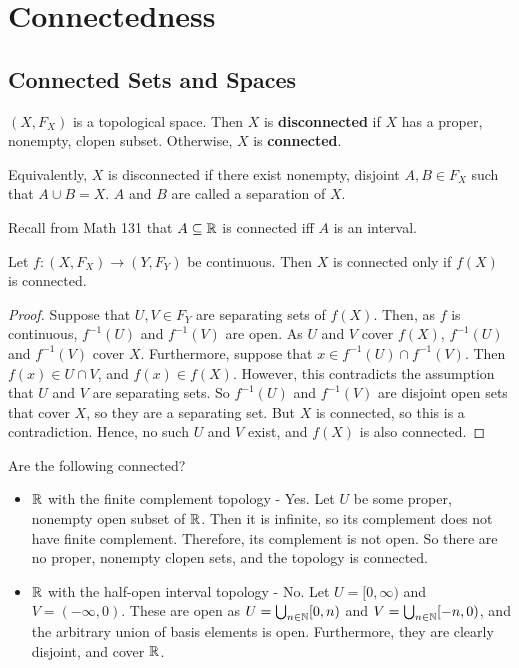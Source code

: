 

\section{Connectedness} 
\subsection{Connected Sets and Spaces} 
\begin{definition}
	$(X,F_X)$ is a topological space. Then $X$ is \textbf{disconnected} if $X$ has a proper, nonempty, clopen subset. Otherwise, $X$ is \textbf{connected}.
	
	Equivalently, $X$ is disconnected if there exist nonempty, disjoint $A,B \in F_X$ such that $A \cup B = X$. $A$ and $B$ are called a separation of $X$. 
\end{definition}

Recall from Math 131 that $A \subseteq \mathbb R$ is connected iff $A$ is an interval.
\begin{theorem}
	Let $f : (X,F_X) \to (Y,F_Y)$ be continuous. Then $X$ is connected only if $f(X)$ is connected. 
\end{theorem}
\begin{proof}
	Suppose that $U,V \in F_Y$ are separating sets of $f(X)$. Then, as $f$ is continuous, $f^{-1}(U)$ and $f^{-1}(V)$ are open. As $U$ and $V$ cover $f(X)$, $f^{-1}(U)$ and $f^{-1}(V)$ cover $X$. Furthermore, suppose that $x \in f^{-1}(U) \cap f^{-1}(V)$. Then $f(x) \in U \cap V$, and $f(x) \in f(X)$. However, this contradicts the assumption that $U$ and $V$ are separating sets. So $f^{-1}(U)$ and $f^{-1}(V)$ are disjoint open sets that cover $X$, so they are a separating set. But $X$ is connected, so this is a contradiction. Hence, no such $U$ and $V$ exist, and $f(X)$ is also connected. 
\end{proof}

Are the following connected? 
\begin{itemize}
	\item $\mathbb R$ with the finite complement topology - Yes. Let $U$ be some proper, nonempty open subset of $\mathbb R$. Then it is infinite, so its complement does not have finite complement. Therefore, its complement is not open. So there are no proper, nonempty clopen sets, and the topology is connected. 
	\item $\mathbb R$ with the half-open interval topology - No. Let $U = [0,\infty)$ and $V = (-\infty,0)$. These are open as $U = \bigcup_{n\in \mathbb N} [0,n)$ and $V = \bigcup_{n \in \mathbb N} [-n,0)$, and the arbitrary union of basis elements is open. Furthermore, they are clearly disjoint, and cover $\mathbb R$. 
\end{itemize}

